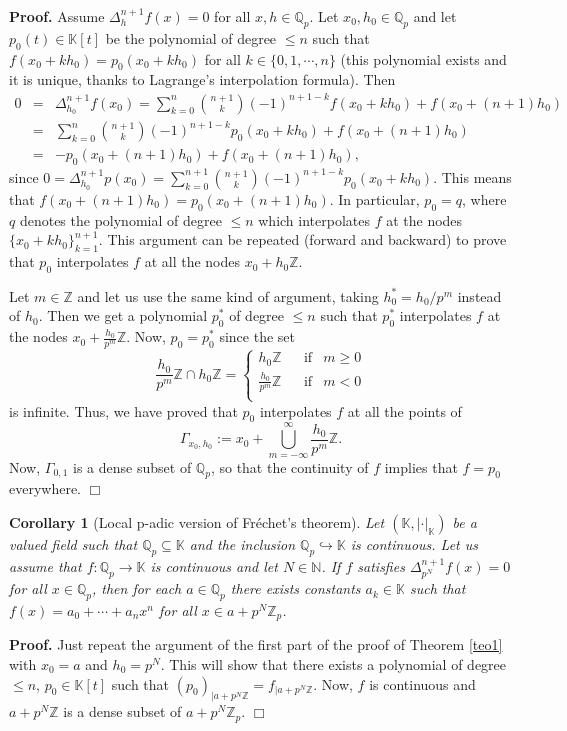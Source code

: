 \documentclass[12pt,a4paper]{amsart}
\newtheorem{corollary}[theorem]{Corollary}
\theoremstyle{definition}
\begin{document}
\noindent \textbf{Proof. } Assume $\Delta_h^{n+1}f(x)=0$ for all $x,h\in\mathbb{Q}_p$. Let $x_0,h_0\in\mathbb{Q}_p$ and let $p_0(t)\in\mathbb{K}[t]$ be the polynomial of degree $\leq n$ such that $f(x_0+kh_0)=p_0(x_0+kh_0)$ for all $k\in\{0,1,\cdots,n\}$ (this polynomial exists and it is unique, thanks to Lagrange's interpolation formula). Then
\begin{eqnarray*}
0 &=&
\Delta_{h_0}^{n+1}f(x_0)=\sum_{k=0}^n\binom{n+1}{k}(-1)^{n+1-k}f(x_0+kh_0)+f(x_0+(n+1)h_0)\\
&=& \sum_{k=0}^n\binom{n+1}{k}(-1)^{n+1-k}p_0(x_0+kh_0)+f(x_0+(n+1)h_0)\\
&=& -p_0(x_0+(n+1)h_0)+f(x_0+(n+1)h_0),
\end{eqnarray*}
since  $0=\Delta_{h_0}^{n+1}p(x_0)=\sum_{k=0}^{n+1}\binom{n+1}{k}(-1)^{n+1-k}p_0(x_0+kh_0)$. This means that $f(x_0+(n+1)h_0)=p_0(x_0+(n+1)h_0)$. In particular, $p_0=q$, where $q$ denotes the polynomial of degree $\leq n$ which interpolates $f$ at the nodes $\{x_0+kh_0\}_{k=1}^{n+1}$. This argument can be repeated (forward and backward) to prove that $p_0$ interpolates $f$ at all the nodes $x_0+h_0\mathbb{Z}$.

Let $m\in\mathbb{Z}$ and let us use the same kind of argument, taking $h_0^*=h_0/p^m$ instead of $h_0$. Then we get a polynomial $p_0^*$ of degree $\leq n$ such that $p_0^*$  interpolates $f$ at the nodes $x_0+\frac{h_0}{p^m}\mathbb{Z}$. Now, $p_0=p_0^*$ since the set
\[
\frac{h_0}{p^m}\mathbb{Z}\cap h_0\mathbb{Z}=\left\{
\begin{array}{cccccc}
h_0\mathbb{Z} &  & \text{if} &   m\geq 0 \\
\frac{h_0}{p^m}\mathbb{Z}  &  & \text{if} & m< 0\\
\end{array}
\right.
\]
is infinite. Thus, we have proved that $p_0$ interpolates $f$ at all the points of  $$\Gamma_{x_0,h_0}:=x_0+\bigcup_{m=-\infty}^\infty\frac{h_0}{p^m}\mathbb{Z}.$$
Now, $\Gamma_{0,1}$ is a dense subset of $\mathbb{Q}_p$, so that the continuity of $f$ implies that $f=p_0$ everywhere. {\hfill $\Box$}

\begin{corollary} [Local p-adic version of Fr\'{e}chet's theorem]
Let $(\mathbb{K},|\cdot|_{\mathbb{K}})$ be a valued field such that $\mathbb{Q}_p\subseteq \mathbb{K}$ and the inclusion $\mathbb{Q}_p \hookrightarrow\mathbb{K}$ is continuous. Let us assume that $f:\mathbb{Q}_p\to \mathbb{K}$ is continuous and let $N\in\mathbb{N}$. If  $f$ satisfies $\Delta_{p^N}^{n+1}f(x)=0$ for all $x\in\mathbb{Q}_p$, then for each $a\in\mathbb{Q}_p$ there exists constants $a_k\in \mathbb{K}$ such that $f(x)=a_0+\cdots+a_nx^n$ for all $x\in a+p^N\mathbb{Z}_p$.
\end{corollary}
\noindent \textbf{Proof. } Just repeat the argument of the first part of the proof of Theorem \ref{teo1}   with $x_0=a$ and $h_0=p^N$. This will show that there exists a polynomial of degree $\leq n$, $p_0\in \mathbb{K}[t]$ such that $(p_0)_{|a+p^N\mathbb{Z}}= f_{|a+p^N\mathbb{Z}}$. Now, $f$ is continuous and $a+p^N\mathbb{Z}$ is a dense subset of $a+p^N\mathbb{Z}_p$. {\hfill $\Box$}
\end{document}
